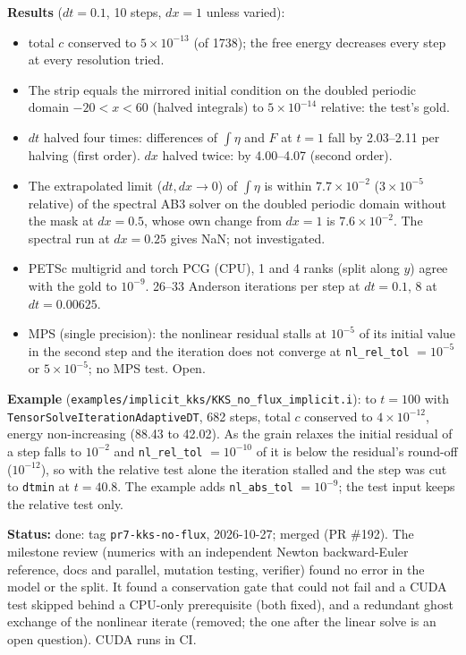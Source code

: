 \documentclass[11pt]{article}
\newcommand{\status}[1]{\textcolor{marlinteal}{\textbf{Status:}} #1}
\begin{document}
\textbf{Results} ($dt = 0.1$, 10 steps, $dx = 1$ unless varied):
\begin{itemize}
  \item total $c$ conserved to $5\times10^{-13}$ (of 1738); the free energy decreases
    every step at every resolution tried.
  \item The strip equals the mirrored initial condition on the doubled periodic domain
    $-20 < x < 60$ (halved integrals) to $5\times10^{-14}$ relative: the test's gold.
  \item $dt$ halved four times: differences of $\int\eta$ and $F$ at $t = 1$ fall by
    2.03--2.11 per halving (first order). $dx$ halved twice: by 4.00--4.07 (second order).
  \item The extrapolated limit ($dt, dx \to 0$) of $\int\eta$ is within
    $7.7\times10^{-2}$ ($3\times10^{-5}$ relative) of the spectral AB3 solver on the doubled
    periodic domain without the mask at $dx = 0.5$, whose own change from $dx = 1$ is
    $7.6\times10^{-2}$. The spectral run at $dx = 0.25$ gives NaN; not investigated.
  \item PETSc multigrid and torch PCG (CPU), 1 and 4 ranks (split along $y$) agree with the gold to
    $10^{-9}$. 26--33 Anderson iterations per step at $dt = 0.1$, 8 at $dt = 0.00625$.
  \item MPS (single precision): the nonlinear residual stalls at $10^{-5}$ of its initial
    value in the second step and the iteration does not converge at
    \texttt{nl\_rel\_tol} $= 10^{-5}$ or $5\times10^{-5}$; no MPS test. Open.
\end{itemize}

\textbf{Example} (\texttt{examples/implicit\_kks/KKS\_no\_flux\_implicit.i}): to $t = 100$
with \texttt{TensorSolveIterationAdaptiveDT}, 682 steps, total $c$ conserved to
$4\times10^{-12}$, energy non-increasing (88.43 to 42.02). As the grain relaxes the initial
residual of a step falls to $10^{-2}$ and \texttt{nl\_rel\_tol} $= 10^{-10}$ of it is below
the residual's round-off ($10^{-12}$), so with the relative test alone the iteration stalled
and the step was cut to \texttt{dtmin} at $t = 40.8$. The example adds
\texttt{nl\_abs\_tol} $= 10^{-9}$; the test input keeps the relative test only.

\status{done: tag \texttt{pr7-kks-no-flux}, 2026-10-27; merged (PR \#192). The milestone review
(numerics with an independent Newton backward-Euler reference, docs and parallel, mutation
testing, verifier) found no error in the model or the split. It found a conservation gate
that could not fail and a CUDA test skipped behind a CPU-only prerequisite (both fixed), and
a redundant ghost exchange of the nonlinear iterate (removed; the one after the linear solve
is an open question). CUDA runs in CI.}
\end{document}
